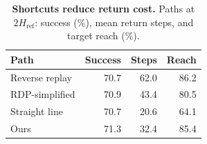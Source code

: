 \begin{table}
\vspace{-4pt}
\captionsetup{justification=raggedright,singlelinecheck=false}
\centering
\small
\setlength{\tabcolsep}{3pt}
\caption{\textbf{Shortcuts reduce return cost.} Paths at $2H_{\mathrm{ref}}$: success (\%), mean return steps, and target reach (\%).}
\label{tab:rewind-path}
\begin{tabular}{@{}lrrr@{}}
\toprule
Path & Success & Steps & Reach \\
\midrule
Reverse replay & 70.7 & 62.0 & 86.2 \\
RDP-simplified & 70.9 & 43.4 & 80.5 \\
Straight line & 70.7 & 20.6 & 64.1 \\
\rowcolor{linkblue!12}
Ours & 71.3 & 32.4 & 85.4 \\
\bottomrule
\end{tabular}
\end{table}
